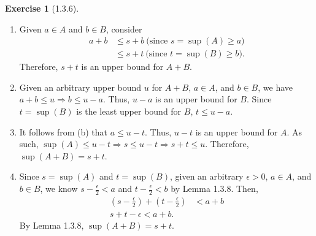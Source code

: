 \documentclass{amsart}
\theoremstyle{definition}
\newtheorem{exercise}{Exercise}
\begin{document}
\begin{exercise}[1.3.6]
  \begin{enumerate}[label={(\alph*)}]
    \item Given $a \in A$ and $b \in B$, consider
      \begin{align*}
        a + b &\le s + b\ \text{(since $s = \sup(A) \ge a$)} \\
        &\le s + t\ \text{(since $t = \sup(B) \ge b$)}.
      \end{align*}
      Therefore, $s + t$ is an upper bound for $A + B$.
    \item Given an arbitrary upper bound $u$ for  $A + B$, $a \in A$, and $b \in
      B$, we have $a + b \le u \Rightarrow b \le u - a$. Thus, $u - a$ is an
      upper bound for $B$. Since $t = \sup(B)$ is the least upper bound for $B$,
      $t \le u - a$.
    \item It follows from (b) that $a \le u - t$. Thus, $u - t$ is an upper
      bound for $A$. As such, $\sup(A) \le u - t \Rightarrow s \le u - t
      \Rightarrow s + t \le u$. Therefore, $\sup(A + B) = s + t$.
    \item Since $s = \sup(A)$ and $t = \sup(B)$, given an arbitrary $\epsilon >
      0$, $a \in A$, and $b \in B$, we know $s - \frac{\epsilon}{2} < a$ and $t
      - \frac{\epsilon}{2} < b$ by Lemma 1.3.8. Then,
      \begin{align*}
        (s - \frac{\epsilon}{2}) + (t - \frac{\epsilon}{2}) &< a + b \\
        s + t - \epsilon < a + b.
      \end{align*}
      By Lemma 1.3.8, $\sup(A + B) = s + t$.
  \end{enumerate}
\end{exercise}
\end{document}
